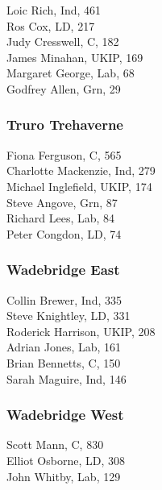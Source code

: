\documentclass[a4paper,openany,10pt]{book}
\begin{document}


Loic Rich, Ind, 461\\
Ros Cox, LD, 217\\
Judy Cresswell, C, 182\\
James Minahan, UKIP, 169\\
Margaret George, Lab, 68\\
Godfrey Allen, Grn, 29\\


\vfill\eject

\subsubsection*{Truro Trehaverne}



Fiona Ferguson, C, 565\\
Charlotte Mackenzie, Ind, 279\\
Michael Inglefield, UKIP, 174\\
Steve Angove, Grn, 87\\
Richard Lees, Lab, 84\\
Peter Congdon, LD, 74\\


\subsubsection*{Wadebridge East}



Collin Brewer, Ind, 335\\
Steve Knightley, LD, 331\\
Roderick Harrison, UKIP, 208\\
Adrian Jones, Lab, 161\\
Brian Bennetts, C, 150\\
Sarah Maguire, Ind, 146\\


\subsubsection*{Wadebridge West}



Scott Mann, C, 830\\
Elliot Osborne, LD, 308\\
John Whitby, Lab, 129\\
\end{document}
